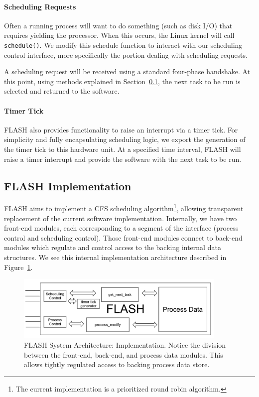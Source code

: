 \documentclass{sig-alternate-10pt}
\begin{document}
\paragraph{Scheduling Requests}
Often a running process will want to do something (such as disk I/O) that
requires yielding the processor.  When this occurs, the Linux kernel will
call \texttt{schedule()}.  We modify this schedule function to interact with
our scheduling control interface, more specifically the portion dealing with
scheduling requests.

A scheduling request will be received using a standard four-phase handshake.
At this point, using methods explained in Section~\ref{sec:FLASH_impl}, the
next task to be run is selected and returned to the software.

\paragraph{Timer Tick}
FLASH also provides functionality to raise an interrupt via a timer tick.
For simplicity and fully encapsulating scheduling logic, we export the
generation of the timer tick to this hardware unit.  At a specified time
interval, FLASH will raise a timer interrupt and provide the software with
the next task to be run.

\subsection{FLASH Implementation}
\label{sec:FLASH_impl}
FLASH aims to implement a CFS scheduling algorithm\footnote{The current
implementation is a prioritized round robin algorithm.}, allowing
transparent replacement of the current software implementation.  Internally,
we have two front-end modules, each corresponding to a segment of the
interface (process control and scheduling control). Those front-end modules
connect to back-end modules which regulate and control access to the backing
internal data structures.  We see this internal implementation architecture
described in Figure~\ref{fig:impl_overview}.

\begin{figure}
	\begin{center}
		\includegraphics[width=0.9\textwidth]{fig/flash-impl.png}
		\caption{
			FLASH System Architecture: Implementation.  Notice the division
			between the front-end, back-end, and process data modules.  This
			allows tightly regulated access to backing process data store.
		}
		\label{fig:impl_overview}
	\end{center}
\end{figure}
\end{document}
